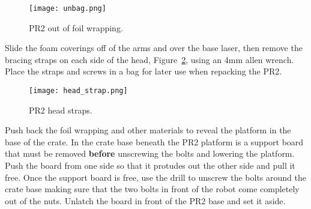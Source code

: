 \begin{figure}[h]
\centering
\texttt{[image: unbag.png]}
\caption{PR2 out of foil wrapping.}
\label{fig:unbagPR2}
\end{figure}

Slide the foam coverings off of the arms and over the base laser, then remove
the bracing straps on each side of the head, Figure~\ref{fig:head_straps}, using
an 4mm allen wrench. Place the straps and screws in a bag for later use when
repacking the PR2.

\begin{figure}[h]
\centering
\texttt{[image: head\_strap.png]}
\caption{PR2 head straps.}
\label{fig:head_straps}
\end{figure}

Push back the foil wrapping and other materials to reveal the platform in the
base of the crate. In the crate base beneath the PR2 platform is a support board
that must be removed {\bf before} unscrewing the bolts and lowering the platform. Push
the board from one side so that it protudes out the other side and pull it
free. Once the support board is free, use the drill to unscrew the bolts around
the crate base making sure that the two bolts in front of the robot come
completely out of the nuts. Unlatch the board in front of the PR2 base and set
it aside.
